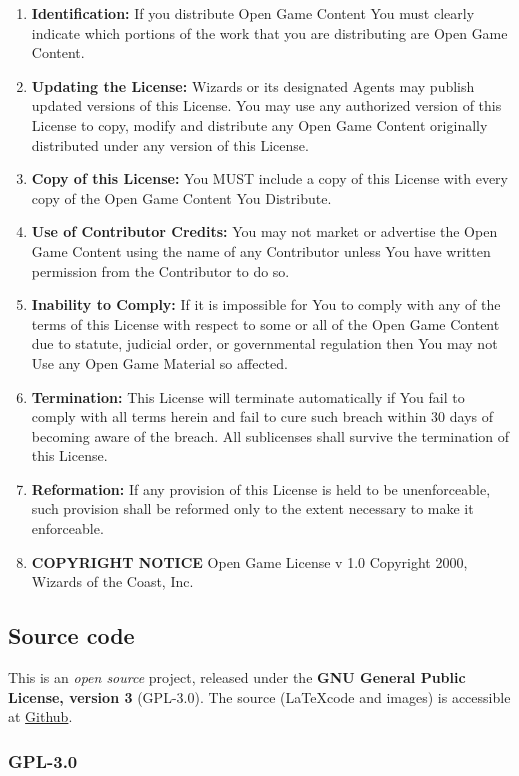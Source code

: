 \begin{enumerate}
 \item \textbf{Identification:} If you distribute Open Game Content You must clearly indicate which portions of the work that you are distributing are Open Game Content.
 \item \textbf{Updating the License:} Wizards or its designated Agents may publish updated versions of this License. You may use any authorized version of this License to copy, modify and distribute any Open Game Content originally distributed under any version of this License.
 \item \textbf{Copy of this License:} You MUST include a copy of this License with every copy of the Open Game Content You Distribute.
 \item \textbf{Use of Contributor Credits:} You may not market or advertise the Open Game Content using the name of any Contributor unless You have written permission from the Contributor to do so.
 \item \textbf{Inability to Comply:} If it is impossible for You to comply with any of the terms of this License with respect to some or all of the Open Game Content due to statute, judicial order, or governmental regulation then You may not Use any Open Game Material so affected.
 \item \textbf{Termination:} This License will terminate automatically if You fail to comply with all terms herein and fail to cure such breach within 30 days of becoming aware of the breach. All sublicenses shall survive the termination of this License.
 \item \textbf{Reformation:} If any provision of this License is held to be unenforceable, such provision shall be reformed only to the extent necessary to make it enforceable.
 \item \textbf{COPYRIGHT NOTICE} Open Game License v 1.0 Copyright 2000, Wizards of the Coast, Inc.
\end{enumerate}
\subsection{Source code}
This is an \emph{open source} project, released under the \textbf{GNU General Public License, version 3} (GPL-3.0). The source (\LaTeX code and images) is accessible at \href{https://github.com/Ernir/VancianToPsionics}{Github}.
\subsubsection{GPL-3.0}

